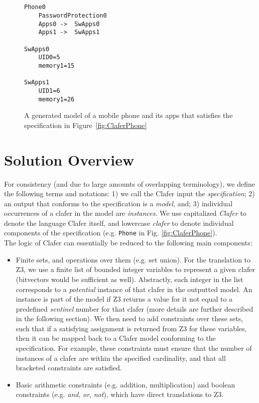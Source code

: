 \documentclass{article}
\newcommand{\figref}[1]{Figure~\ref{#1}}
\begin{document}
\begin{figure}[!t]
 \begin{lstlisting}[language=clafer]


Phone0
	PasswordProtection0
	Apps0 ->  SwApps0
	Apps1 ->  SwApps1
	
SwApps0 
	UID0=5
	memory1=15

SwApps1 
	UID1=6
	memory1=26
  \end{lstlisting}
 \caption{A generated model of a mobile phone and its apps  that satisfies the specification in \figref{fig:ClaferPhone} }
 \label{fig:ClaferPhoneInstance}
\end{figure}


\section{Solution Overview}
For consistency (and due to large amounts of overlapping terminology), we define the following terms and notations: 1) we call the Clafer input the \textit{specification}; 2) an output that conforms to the specification is a \textit{model}, and; 3) individual occurrences of a clafer in the model are \textit{instances}. We use capitalized \textit{Clafer} to denote the language Clafer itself, and lowercase \textit{clafer} to denote individual components of the specification (e.g. \texttt{Phone} in Fig. \ref{fig:ClaferPhone}).\\
\indent The logic of Clafer can essentially be reduced to the following main components:
\begin{itemize}
\item Finite sets, and operations over them (e.g. set union). For the translation to Z3, we use a finite list of bounded integer variables to represent a given clafer (bitvectors would be sufficient as well). Abstractly, each integer in the list corresponds to a \textit{potential} instance of that clafer in the outputted model. An instance is part of the model if Z3 returns a value for it not equal to a predefined \textit{sentinel} number for that clafer (more details are further described in the following section). We then need to add constraints over these sets, such that if a satisfying assignment is returned from Z3 for these variables, then it can be mapped back to a Clafer model conforming to the specification. For example, these constraints must ensure that the number of instances of a clafer are within the specified cardinality, and that all bracketed constraints are satisfied.
\item Basic arithmetic constraints (e.g. addition, multiplication) and boolean constraints (e.g. \textit{and}, \textit{or}, \textit{not}), which have direct translations to Z3.
\end{itemize} 
\end{document}
